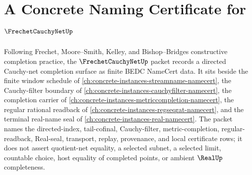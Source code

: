 \chapter{A Concrete Naming Certificate for $\FrechetCauchyNetUp$}
\label{ch:concrete-instances-frechet-cauchy-net-namecert}

Following Frechet, Moore--Smith, Kelley, and Bishop--Bridges constructive completion practice, the $\FrechetCauchyNetUp$ packet records a directed Cauchy-net completion surface as finite BEDC NameCert data. It sits beside the finite window schedule of \autoref{ch:concrete-instances-streamname-namecert}, the Cauchy-filter boundary of \autoref{ch:concrete-instances-cauchyfilter-namecert}, the completion carrier of \autoref{ch:concrete-instances-metriccompletion-namecert}, the regular rational readback of \autoref{ch:concrete-instances-regseqrat-namecert}, and the terminal real-name seal of \autoref{ch:concrete-instances-real-namecert}. The packet names the directed-index, tail-cofinal, Cauchy-filter, metric-completion, regular-readback, Real-seal, transport, replay, provenance, and local certificate rows; it does not assert quotient-net equality, a selected subnet, a selected limit, countable choice, host equality of completed points, or ambient $\RealUp$ completeness.

